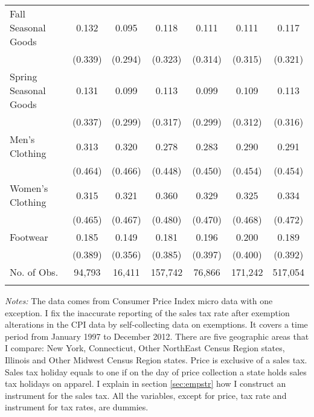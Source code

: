 \documentclass[12pt]{article}
\begin{document}
\begin{table}
\begin{threeparttable}
\begin{tabular}{lcccccc}
					Fall Seasonal Goods & 0.132 & 0.095 & 0.118 & 0.111 & 0.111 & 0.117\\
					& (0.339) & (0.294) & (0.323) & (0.314) & (0.315) & (0.321)\\
					Spring Seasonal Goods & 0.131 & 0.099 & 0.113 & 0.099 & 0.109 & 0.113\\
					& (0.337) & (0.299) & (0.317) & (0.299) & (0.312) & (0.316)\\
					Men's Clothing & 0.313 & 0.320 & 0.278 & 0.283 & 0.290 & 0.291\\
					& (0.464) & (0.466) & (0.448) & (0.450) & (0.454) & (0.454)\\
					Women's Clothing & 0.315 & 0.321 & 0.360 & 0.329 & 0.325 & 0.334\\
					& (0.465) & (0.467) & (0.480) & (0.470) & (0.468) & (0.472)\\
					Footwear & 0.185 & 0.149 & 0.181 & 0.196 & 0.200 & 0.189\\
					& (0.389) & (0.356) & (0.385) & (0.397) & (0.400) & (0.392)\\
					No. of Obs. & 94,793 & 16,411 & 157,742 & 76,866 & 171,242 & 517,054\\		
					\noalign{\smallskip}\hline
				\end{tabular}
				\begin{tablenotes}
					\small \emph{Notes:} The data comes from Consumer Price Index micro data with one exception. I fix 
					the inaccurate reporting of the sales tax rate after exemption alterations in the CPI data 
					by self-collecting data on exemptions.   It covers a time period from January 1997 to December 2012. There are five geographic areas that I compare: New York, Connecticut, Other NorthEast Census Region states, Illinois and Other Midwest Census Region states. Price is exclusive of a sales tax. Sales tax holiday equals to one if on the day of price collection a state holds sales tax holidays on apparel. I explain in section \ref{sec:empstr} how I construct an instrument for the sales tax. All the variables, except for price, tax rate and instrument for tax rates, are dummies. 
				\end{tablenotes}
			\end{threeparttable}
		\end{table}
		
\end{document}

